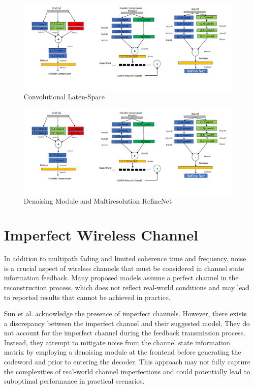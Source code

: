 \documentclass[lettersize,journal]{IEEEtran}
\begin{document}
\begin{figure}[ht]
	\centering
	\includegraphics[width=0.8\linewidth]{Model_b.pdf}
	\caption{Convolutional Laten-Space}
	\label{fig:figure2}
\end{figure}

\begin{figure}[ht]
	\centering
	\includegraphics[width=0.8\linewidth]{Model_c.pdf}
	\caption{Denoising Module and Multiresolution RefineNet}
	\label{fig:figure3}
\end{figure}




\section{Imperfect Wireless Channel}
In addition to multipath fading and limited coherence time and frequency, noise is a crucial aspect of wireless channels that must be considered in channel state information feedback. Many proposed models assume a perfect channel in the reconstruction process, which does not reflect real-world conditions and may lead to reported results that cannot be achieved in practice.

Sun et al. \cite{bbb1} acknowledge the presence of imperfect channels. However, there exists a discrepancy between the imperfect channel and their suggested model. They do not account for the imperfect channel during the feedback transmission process. Instead, they attempt to mitigate noise from the channel state information matrix by employing a denoising module at the frontend before generating the codeword and prior to entering the decoder. This approach may not fully capture the complexities of real-world channel imperfections and could potentially lead to suboptimal performance in practical scenarios.
\end{document}
